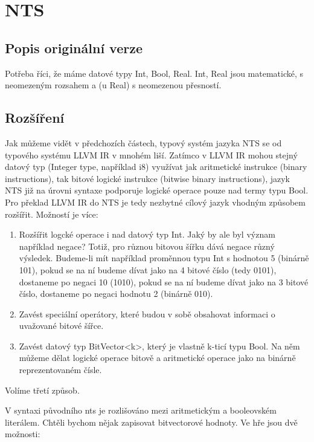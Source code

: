 \documentclass[10pt,a4paper,notitlepage]{report}
\begin{document}
\section{NTS}

\subsection{Popis originální verze}
Potřeba říci, že máme datové typy Int, Bool, Real. Int, Real jsou matematické, s neomezeným rozsahem a (u Real) s neomezenou přesností.

\subsection{Rozšíření}

Jak můžeme vidět v předchozích částech, typový systém jazyka NTS se od typového systému LLVM IR 
v mnohém liší. Zatímco v LLVM IR mohou stejný datový typ (Integer type, například i8) využívat jak aritmetické instrukce (binary instructions), tak bitové logické instrukce (bitwise binary instructions), jazyk NTS již na úrovni syntaxe podporuje logické operace pouze nad termy typu Bool. Pro překlad LLVM IR do NTS je tedy nezbytné cílový jazyk vhodným způsobem rozšířit. Možností je více:
\begin{enumerate}
\item Rozšířit logcké operace i nad datový typ Int. Jaký by ale byl význam například negace? Totiž, pro různou bitovou šířku dává negace různý výsledek. Budeme-li mít například proměnnou typu Int s hodnotou 5 (binárně 101), pokud se na ní budeme dívat jako na 4 bitové číslo (tedy 0101), dostaneme po negaci 10 (1010), pokud se na ní budeme dívat jako na 3 bitové číslo, dostaneme po negaci hodnotu 2 (binárně 010). 

\item Zavést speciální operátory, které budou v sobě obsahovat informaci o uvažované bitové šířce.

\item Zavést datový typ BitVector<k>, který je vlastně k-ticí typu Bool. Na něm můžeme dělat logické operace bitově a aritmetické operace jako na binárně reprezentovaném čísle. 
\end{enumerate}

Volíme třetí způsob.

V syntaxi původního nts je rozlišováno mezi aritmetickým a booleovském literálem. Chtěli bychom nějak zapisovat bitvectorové hodnoty. Ve hře jsou dvě možnosti:
\end{document}
